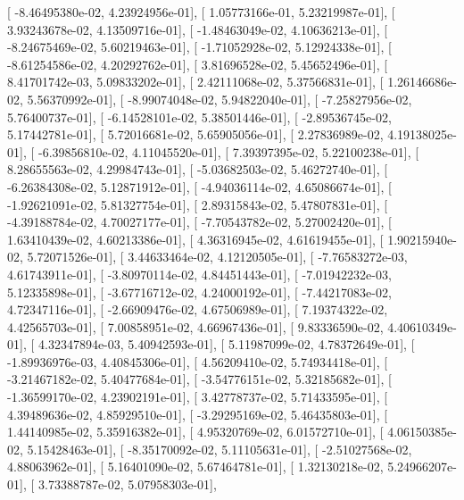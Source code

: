 \documentclass{article}
\begin{document}
       [ -8.46495380e-02,   4.23924956e-01],
       [  1.05773166e-01,   5.23219987e-01],
       [  3.93243678e-02,   4.13509716e-01],
       [ -1.48463049e-02,   4.10636213e-01],
       [ -8.24675469e-02,   5.60219463e-01],
       [ -1.71052928e-02,   5.12924338e-01],
       [ -8.61254586e-02,   4.20292762e-01],
       [  3.81696528e-02,   5.45652496e-01],
       [  8.41701742e-03,   5.09833202e-01],
       [  2.42111068e-02,   5.37566831e-01],
       [  1.26146686e-02,   5.56370992e-01],
       [ -8.99074048e-02,   5.94822040e-01],
       [ -7.25827956e-02,   5.76400737e-01],
       [ -6.14528101e-02,   5.38501446e-01],
       [ -2.89536745e-02,   5.17442781e-01],
       [  5.72016681e-02,   5.65905056e-01],
       [  2.27836989e-02,   4.19138025e-01],
       [ -6.39856810e-02,   4.11045520e-01],
       [  7.39397395e-02,   5.22100238e-01],
       [  8.28655563e-02,   4.29984743e-01],
       [ -5.03682503e-02,   5.46272740e-01],
       [ -6.26384308e-02,   5.12871912e-01],
       [ -4.94036114e-02,   4.65086674e-01],
       [ -1.92621091e-02,   5.81327754e-01],
       [  2.89315843e-02,   5.47807831e-01],
       [ -4.39188784e-02,   4.70027177e-01],
       [ -7.70543782e-02,   5.27002420e-01],
       [  1.63410439e-02,   4.60213386e-01],
       [  4.36316945e-02,   4.61619455e-01],
       [  1.90215940e-02,   5.72071526e-01],
       [  3.44633464e-02,   4.12120505e-01],
       [ -7.76583272e-03,   4.61743911e-01],
       [ -3.80970114e-02,   4.84451443e-01],
       [ -7.01942232e-03,   5.12335898e-01],
       [ -3.67716712e-02,   4.24000192e-01],
       [ -7.44217083e-02,   4.72347116e-01],
       [ -2.66909476e-02,   4.67506989e-01],
       [  7.19374322e-02,   4.42565703e-01],
       [  7.00858951e-02,   4.66967436e-01],
       [  9.83336590e-02,   4.40610349e-01],
       [  4.32347894e-03,   5.40942593e-01],
       [  5.11987099e-02,   4.78372649e-01],
       [ -1.89936976e-03,   4.40845306e-01],
       [  4.56209410e-02,   5.74934418e-01],
       [ -3.21467182e-02,   5.40477684e-01],
       [ -3.54776151e-02,   5.32185682e-01],
       [ -1.36599170e-02,   4.23902191e-01],
       [  3.42778737e-02,   5.71433595e-01],
       [  4.39489636e-02,   4.85929510e-01],
       [ -3.29295169e-02,   5.46435803e-01],
       [  1.44140985e-02,   5.35916382e-01],
       [  4.95320769e-02,   6.01572710e-01],
       [  4.06150385e-02,   5.15428463e-01],
       [ -8.35170092e-02,   5.11105631e-01],
       [ -2.51027568e-02,   4.88063962e-01],
       [  5.16401090e-02,   5.67464781e-01],
       [  1.32130218e-02,   5.24966207e-01],
       [  3.73388787e-02,   5.07958303e-01],
\end{document}
